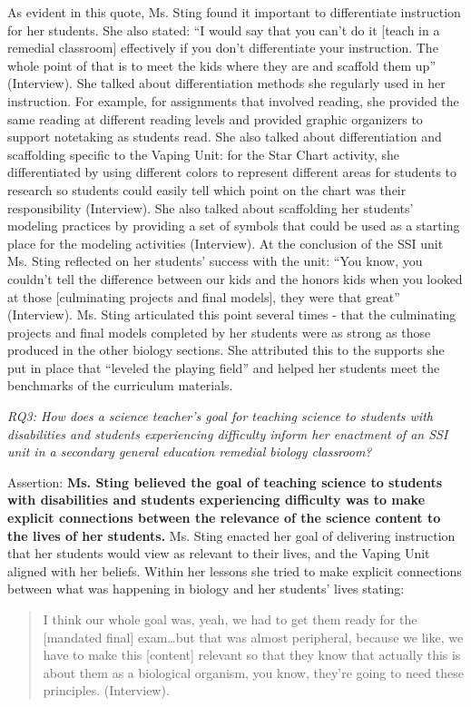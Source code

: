\documentclass[11.5pt]{sig-alternate}
\begin{document}
\begin{large}
As evident in this quote, Ms. Sting found it important to differentiate instruction for her students. She also stated: “I would say that you can’t do it [teach in a remedial classroom] effectively if you don’t differentiate your instruction. The whole point of that is to meet the kids where they are and scaffold them up” (Interview). She talked about differentiation methods she regularly used in her instruction. For example, for assignments that involved reading, she provided the same reading at different reading levels and provided graphic organizers to support
notetaking as students read. She also talked about differentiation and scaffolding specific to the Vaping Unit: for the Star Chart activity, she differentiated by using different colors to represent different areas for students to research so students could easily tell which point on the chart was their responsibility (Interview). She also talked about scaffolding her students’ modeling practices by providing a set of symbols that could be used as a starting place for the modeling activities (Interview). At the conclusion of the SSI unit Ms. Sting reflected on her students’ success with the unit: “You know, you couldn’t tell the difference between our kids and the honors kids when you looked at those [culminating projects and final models], they were that great” (Interview). Ms. Sting articulated this point several times - that the culminating projects and final models completed by her students were as strong as those produced in the other biology sections. She attributed this to the supports she put in place that “leveled the playing field” and helped her students meet the benchmarks of the curriculum materials.

\textit{RQ3: How does a science teacher’s goal for teaching science to students with disabilities and students experiencing difficulty inform her enactment of an SSI unit in a secondary general education remedial biology classroom?}

Assertion: \textbf{Ms. Sting believed the goal of teaching science to students with disabilities and students experiencing difficulty was to make explicit connections between the relevance of the science content to the lives of her students.} Ms. Sting enacted her goal of delivering instruction that her students would view as relevant to their lives, and the Vaping Unit aligned with her beliefs. Within her lessons she tried to make explicit connections between what was happening in biology and her students’ lives stating:

\begin{quote}
    I think our whole goal was, yeah, we had to get them ready for the [mandated final] exam\dots but that was almost peripheral, because we like, we have to make this [content] relevant so that they know that actually this is about them as a biological organism, you know, they’re going to need these principles. (Interview).
\end{quote}


\end{large}
\end{document}

